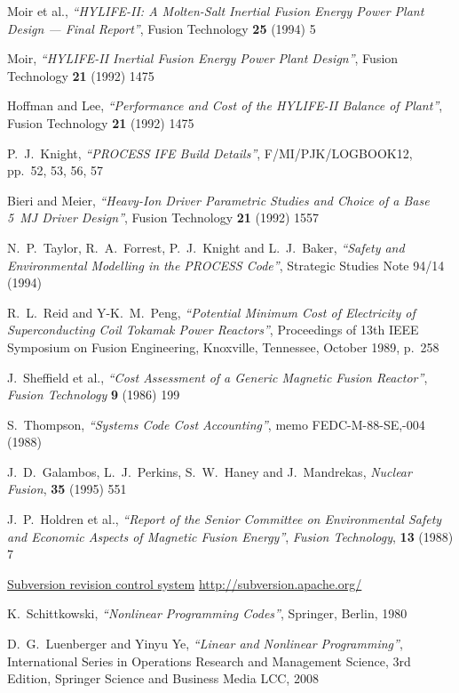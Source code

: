 \documentclass[11pt,a4paper]{report}
\begin{document}
\begin{thebibliography}{99}
Moir et al.,
\textit{``HYLIFE-II: A Molten-Salt Inertial Fusion Energy Power Plant Design
  --- Final Report''},
Fusion Technology \textbf{25} (1994) 5

Moir,
\textit{``HYLIFE-II Inertial Fusion Energy Power Plant Design''},
Fusion Technology \textbf{21} (1992) 1475

Hoffman and Lee,
\textit{``Performance and Cost of the HYLIFE-II Balance of Plant''},
Fusion Technology \textbf{21} (1992) 1475

P.\ J.\ Knight,
\textit{``PROCESS IFE Build Details''},
F/MI/PJK/LOGBOOK12, pp.\ 52, 53, 56, 57

Bieri and Meier,
\textit{``Heavy-Ion Driver Parametric Studies and Choice of a Base 5~MJ Driver
  Design''},
Fusion Technology \textbf{21} (1992) 1557

N.\ P.\ Taylor, R.\ A.\ Forrest, P.\ J.\ Knight and L.\ J.\ Baker,
\textit{``Safety and Environmental Modelling in the PROCESS Code''},
Strategic Studies Note 94/14 (1994)

R.\ L.\ Reid and Y-K.\ M.\ Peng,
\textit{``Potential Minimum Cost of Electricity of Superconducting Coil
Tokamak Power Reactors''},
Proceedings of 13th IEEE Symposium on Fusion Engineering, Knoxville,
Tennessee, October 1989, p.\ 258

J.\ Sheffield et al.,
\textit{``Cost Assessment of a Generic Magnetic Fusion Reactor''},
\textit{Fusion Technology} \textbf{9} (1986) 199

S.\ Thompson,
\textit{``Systems Code Cost Accounting''},
memo FEDC-M-88-SE,-004 (1988)

J.\ D.\ Galambos, L.\ J.\ Perkins, S.\ W.\ Haney and J.\ Mandrekas,
\textit{Nuclear Fusion}, \textbf{35} (1995) 551

J.\ P.\ Holdren et al.,
\textit{``Report of the Senior Committee on Environmental Safety and
Economic Aspects of Magnetic Fusion Energy''},
\textit{Fusion Technology}, \textbf{13} (1988) 7

\href{http://subversion.apache.org/}{Subversion revision control system}
\url{http://subversion.apache.org/}

K.\ Schittkowski,
\textit{``Nonlinear Programming Codes''},
Springer, Berlin, 1980

D.\ G.\ Luenberger and Yinyu Ye,
\textit{``Linear and Nonlinear Programming''},
International Series in Operations Research and Management Science, 3rd Edition,
Springer Science and Business Media LCC, 2008


\end{thebibliography}
\end{document}
